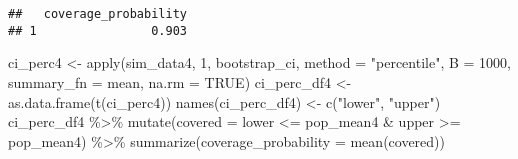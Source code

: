 \documentclass[
]{article}
\newenvironment{Shaded}{\begin{snugshade}}{\end{snugshade}}
\newcommand{\AttributeTok}[1]{\textcolor[rgb]{0.77,0.63,0.00}{#1}}
\newcommand{\ConstantTok}[1]{\textcolor[rgb]{0.00,0.00,0.00}{#1}}
\newcommand{\ControlFlowTok}[1]{\textcolor[rgb]{0.13,0.29,0.53}{\textbf{#1}}}
\newcommand{\DecValTok}[1]{\textcolor[rgb]{0.00,0.00,0.81}{#1}}
\newcommand{\FunctionTok}[1]{\textcolor[rgb]{0.00,0.00,0.00}{#1}}
\newcommand{\NormalTok}[1]{#1}
\newcommand{\OtherTok}[1]{\textcolor[rgb]{0.56,0.35,0.01}{#1}}
\newcommand{\SpecialCharTok}[1]{\textcolor[rgb]{0.00,0.00,0.00}{#1}}
\newcommand{\StringTok}[1]{\textcolor[rgb]{0.31,0.60,0.02}{#1}}
\begin{document}
\begin{Shaded}
\end{Shaded}

\begin{verbatim}
##   coverage_probability
## 1                0.903
\end{verbatim}

\begin{Shaded}
\begin{Highlighting}[]
\NormalTok{ci\_perc4 }\OtherTok{\textless{}{-}} \FunctionTok{apply}\NormalTok{(sim\_data4, }\DecValTok{1}\NormalTok{, bootstrap\_ci, }\AttributeTok{method =} \StringTok{"percentile"}\NormalTok{, }\AttributeTok{B =} \DecValTok{1000}\NormalTok{, }\AttributeTok{summary\_fn =}\NormalTok{ mean, }\AttributeTok{na.rm =} \ConstantTok{TRUE}\NormalTok{)}
\NormalTok{ci\_perc\_df4 }\OtherTok{\textless{}{-}} \FunctionTok{as.data.frame}\NormalTok{(}\FunctionTok{t}\NormalTok{(ci\_perc4))}
\FunctionTok{names}\NormalTok{(ci\_perc\_df4) }\OtherTok{\textless{}{-}} \FunctionTok{c}\NormalTok{(}\StringTok{"lower"}\NormalTok{, }\StringTok{"upper"}\NormalTok{)}
\NormalTok{ci\_perc\_df4 }\SpecialCharTok{\%\textgreater{}\%} \FunctionTok{mutate}\NormalTok{(}\AttributeTok{covered =}\NormalTok{ lower }\SpecialCharTok{\textless{}=}\NormalTok{ pop\_mean4 }\SpecialCharTok{\&}\NormalTok{ upper }\SpecialCharTok{\textgreater{}=}\NormalTok{ pop\_mean4) }\SpecialCharTok{\%\textgreater{}\%}
  \FunctionTok{summarize}\NormalTok{(}\AttributeTok{coverage\_probability =} \FunctionTok{mean}\NormalTok{(covered))}
\end{Highlighting}
\end{Shaded}
\end{document}
